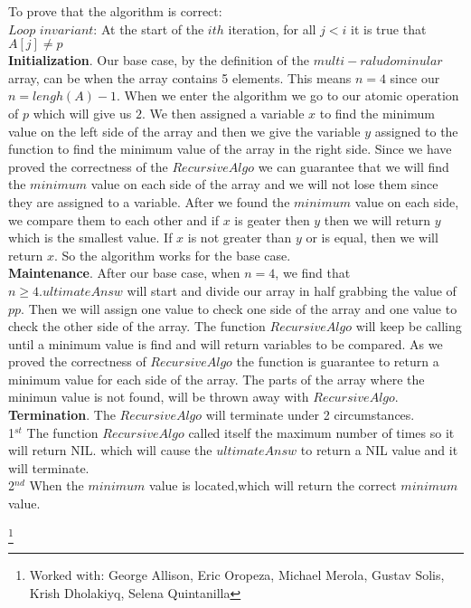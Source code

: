 \documentclass[12pt]{article} \setlength{\oddsidemargin}{0in}
\begin{document}
\begin{enumerate} [label=\textbf{\arabic*}.]
\begin{enumerate}  [label=\textbf{\alph*})]
\begin{verbatim}
    \end{verbatim}
    
    To prove that the algorithm is correct:\\
    $Loop$ $invariant$: At the start of the $ith$ iteration, for all $j<i$ it is true that $A[j] \neq p$\\
    \textbf{Initialization}. Our base case, by the definition of the $multi-raludominular$ array, can be when the array contains 5 elements. This means $n=4$ since our $n=lengh(A) - 1$. When we enter the algorithm we go to our atomic operation of $p$ which will give us $2$. We then assigned a variable $x$ to find the minimum value on the left side of the array and then we give the variable $y$ assigned to the function to find the minimum value of the array in the right side. Since we have proved the correctness of the $RecursiveAlgo$ we can guarantee that we will find the $minimum$ value on each side of the array and we will not lose them since they are assigned to a variable. After we found the $minimum$ value on each side, we compare them to each other and if $x$ is geater then $y$ then we will return $y$ which is the smallest value. If $x$ is not greater than $y$ or is equal, then we will return $x$. So the algorithm works for the base case.\\
    \textbf{Maintenance}. After our base case, when $n=4$, we find that $n\geqslant 4. ultimateAnsw$ will start and divide our array in half grabbing the value of $pp$. Then we will assign one value to check one side of the array and one value to check the other side of the array. The function $RecursiveAlgo$ will keep be calling until a minimum value is find and will return variables to be compared. As we proved the correctness of $RecursiveAlgo$ the function is guarantee to return a minimum value for each side of the array. The parts of the array where the minimun value is not found, will be thrown away with $RecursiveAlgo$. \\
    \textbf{Termination}. The $RecursiveAlgo$ will terminate under 2 circumstances. \\
    1$^{st}$ The function $RecursiveAlgo$ called itself the maximum number of times so it will return NIL. which will cause the $ultimateAnsw$ to return a NIL value and it will terminate.\\
2$^{nd}$ When the $minimum$ value is located,which will return the correct $minimum$ value.\\

  \end{enumerate} \footnote{Worked with: George Allison, Eric Oropeza, Michael Merola, Gustav Solis, Krish Dholakiyq, Selena Quintanilla}



\end{enumerate}
\end{document}
